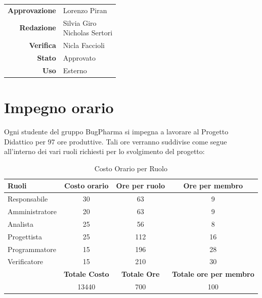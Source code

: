 \documentclass[11pt]{article}
\begin{document}
\begin{titlepage}
\begin{center}
            \large
            
            
            \vfill
            
            \begin{tabular}{r|l}
                \textbf{Approvazione} &  Lorenzo Piran\\
                \textbf{Redazione} &  \parbox[t]{3.5cm}{Silvia Giro \\Nicholas Sertori }\\
                \textbf{Verifica} &  Nicla Faccioli\\
                \textbf{Stato} &  Approvato\\
                \textbf{Uso} & Esterno
            \end{tabular}
            \vfill
            
        \end{center}
    \end{titlepage}

\maketitle

\tableofcontents
\newpage

\section{Impegno orario}
Ogni studente del gruppo BugPharma si impegna a lavorare al Progetto Didattico per 97 ore produttive.
Tali ore verranno suddivise come segue all'interno dei vari ruoli richiesti per lo svolgimento del progetto: \\

\begin{table}[h!]
\centering
\begin{tabular}{|l|c|c|c|}
\hline
\textbf{Ruoli} & \textbf{Costo orario} & \textbf{Ore per ruolo} & \textbf{Ore per membro}\\
\hline
Responsabile & 30 & 63 & 9\\
\hline
Amministratore & 20 & 63 & 9\\
\hline
Analista & 25 & 56 & 8 \\
\hline
Progettista & 25 & 112 & 16\\
\hline
Programmatore & 15 & 196 & 28\\
\hline
Verificatore & 15 & 210 & 30\\
\hline
            & \textbf{Totale Costo} & \textbf{Totale Ore} & \textbf{Totale ore per membro} \\
\hline
            & \cellcolor{green!25}13440 & 700 & 100 \\
\hline
\end{tabular}
\caption{Costo Orario per Ruolo}
\label{table:1}
\end{table}
\end{document}
